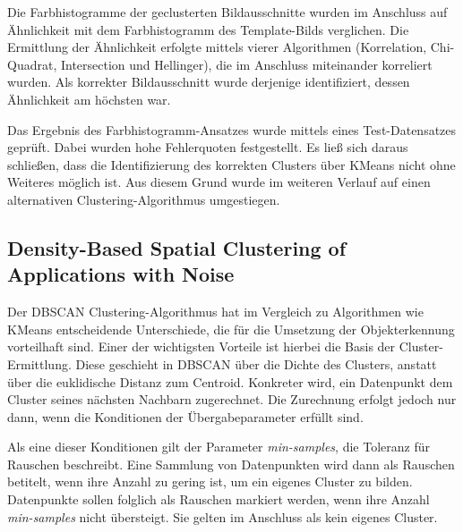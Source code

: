 \documentclass[
    type=Prakikumsbericht,
    status=draft, %
    language=german, %
    bibengine=bibtex,
]{unibwm-inf-thesis}
\begin{document}
    Die Farbhistogramme der geclusterten Bildausschnitte wurden im Anschluss auf Ähnlichkeit mit dem Farbhistogramm des Template-Bilds verglichen.
    Die Ermittlung der Ähnlichkeit erfolgte mittels vierer Algorithmen (Korrelation, Chi-Quadrat, Intersection und Hellinger), die im Anschluss miteinander korreliert wurden.
    Als korrekter Bildausschnitt wurde derjenige identifiziert, dessen Ähnlichkeit am höchsten war.

    Das Ergebnis des Farbhistogramm-Ansatzes wurde mittels eines Test-Datensatzes geprüft.
    Dabei wurden hohe Fehlerquoten festgestellt.
    Es ließ sich daraus schließen, dass die Identifizierung des korrekten Clusters über KMeans nicht ohne Weiteres möglich ist.
    Aus diesem Grund wurde im weiteren Verlauf auf einen alternativen Clustering-Algorithmus umgestiegen.

    \subsection{Density-Based Spatial Clustering of Applications with Noise}\label{subsec:dbscan}
    Der \ac{DBSCAN} Clustering-Algorithmus hat im Vergleich zu Algorithmen wie KMeans entscheidende Unterschiede, die für die Umsetzung der Objekterkennung vorteilhaft sind.
    Einer der wichtigsten Vorteile ist hierbei die Basis der Cluster-Ermittlung.
    Diese geschieht in \ac{DBSCAN} über die Dichte des Clusters, anstatt über die euklidische Distanz zum Centroid.
    Konkreter wird, ein Datenpunkt dem Cluster seines nächsten Nachbarn zugerechnet.
    Die Zurechnung erfolgt jedoch nur dann, wenn die Konditionen der Übergabeparameter erfüllt sind.

    Als eine dieser Konditionen gilt der Parameter \textit{min-samples}, die Toleranz für Rauschen beschreibt.
    Eine Sammlung von Datenpunkten wird dann als Rauschen betitelt, wenn ihre Anzahl zu gering ist, um ein eigenes Cluster zu bilden.
    Datenpunkte sollen folglich als Rauschen markiert werden, wenn ihre Anzahl \textit{min-samples} nicht übersteigt.
    Sie gelten im Anschluss als kein eigenes Cluster.
\end{document}
